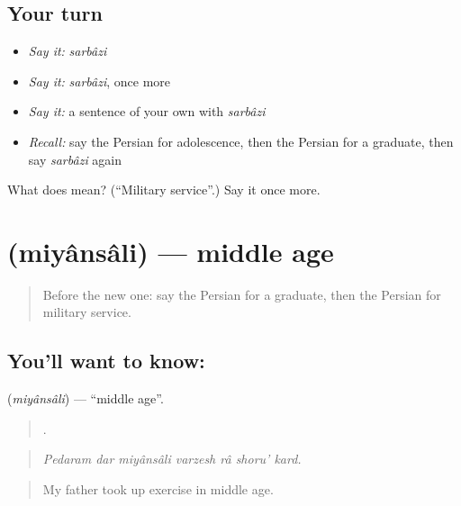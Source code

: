 \subsection*{Your turn}
\begin{itemize}
\raggedright
  \item \emph{Say it:} \emph{sarbâzi}
  \item \emph{Say it:} \emph{sarbâzi}, once more
  \item \emph{Say it:} a sentence of your own with \emph{sarbâzi}
  \item \emph{Recall:} say the Persian for adolescence, then the Persian for a graduate, then say \emph{sarbâzi} again
\end{itemize}

\begin{tcolorbox}[breakable,colback=teal!4,colframe=teal!35!black,title={Before you move on}]
What does  mean? (\textquotedblleft{}Military service\textquotedblright{}.) Say it once more.
\end{tcolorbox}
\section[\texorpdfstring{\fa{میانسالی} (miyânsâli)}{میانسالی (miyânsâli)}]{ (miyânsâli) — middle age}

\label{lesson:FA-C333-miyansali}



\begin{quote}
Before the new one: say the Persian for a graduate, then the Persian for military service.
\end{quote}

\subsection*{You'll want to know: }
\textbf{} (\emph{miyânsâli}) — \textquotedblleft{}middle age\textquotedblright{}.

\begin{quote}
      .
\end{quote}

\begin{quote}
\emph{Pedaram dar miyânsâli varzesh râ shoru' kard.}
\end{quote}

\begin{quote}
My father took up exercise in middle age.
\end{quote}


